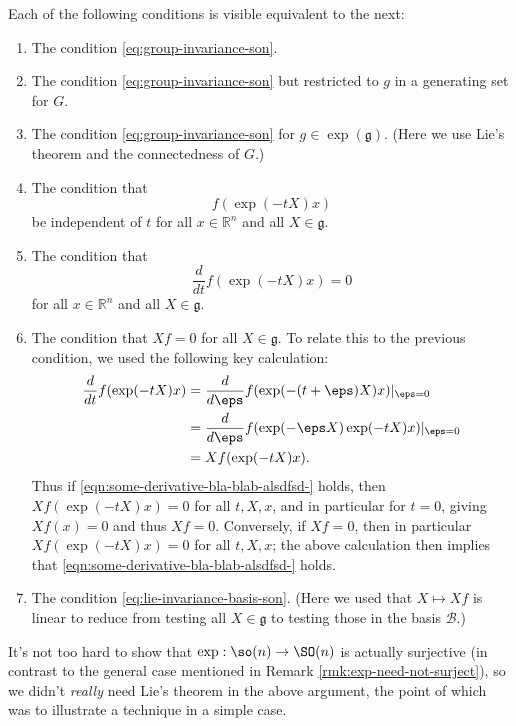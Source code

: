 \documentclass[reqno]{amsart} 
\begin{document}
Each of the following conditions is visible equivalent to the next:
\begin{enumerate}
\item The condition
  \eqref{eq:group-invariance-son}.
\item The condition
  \eqref{eq:group-invariance-son}
  but restricted to $g$ in a generating set for $G$.
\item
   The condition
   \eqref{eq:group-invariance-son}
   for $g \in \exp(\mathfrak{g})$.
   (Here we use Lie's theorem and the connectedness of $G$.)
 \item The condition that
   \begin{equation*}
     f(\exp(-t X) x)
   \end{equation*}
   be independent of $t$ for all $x \in \mathbb{R}^n$ and all $X
   \in \mathfrak{g}$.
 \item The condition that
   \begin{equation}\label{eqn:some-derivative-bla-blab-alsdfsd-}
     \frac{d}{d t} f(\exp(-t X) x) = 0
   \end{equation}
   for all $x \in \mathbb{R}^n$ and all $X
   \in \mathfrak{g}$.
 \item The condition
  that $X f = 0$ for all $X \in \mathfrak{g}$.
   To relate this to the previous condition,
   we used the following key calculation:
   \begin{align*}
     \frac{d}{d t} f(\exp(-t X) x)
     &= 
       \frac{d}{d \eps} f(\exp(-(t+\eps) X) x)|_{\eps=0}
       \\
     &= 
       \frac{d}{d \eps} f(\exp(- \eps X) \exp(-t X) x)|_{\eps=0}
       \\
     &= 
     X f(\exp(-t X) x).
   \end{align*}
   Thus if \eqref{eqn:some-derivative-bla-blab-alsdfsd-} holds,
   then $X f (\exp(-t X) x) = 0$ for all $t,X,x$,
   and in particular for $t = 0$,
   giving $X f(x) = 0$ and thus $X f = 0$.
   Conversely,
   if $X f = 0$,
   then in particular $X f(\exp(-t X) x) = 0$ for all $t,X,x$;
   the above calculation then implies that
   \eqref{eqn:some-derivative-bla-blab-alsdfsd-} holds.
\item The condition
  \eqref{eq:lie-invariance-basis-son}.
  (Here we used that $X \mapsto X f$ is linear to reduce from
  testing 
  all $X \in \mathfrak{g}$
  to testing those in the basis $\mathcal{B}$.)
\end{enumerate}
\begin{remark}
  It's not too hard to show that
  $\exp : \so(n) \rightarrow \SO(n)$ is actually surjective (in
  contrast to the general case mentioned in Remark
  \ref{rmk:exp-need-not-surject}), so we didn't \emph{really}
  need Lie's theorem in the above argument, the point of which
  was to illustrate a technique in a simple case.
\end{remark}
\end{document}
